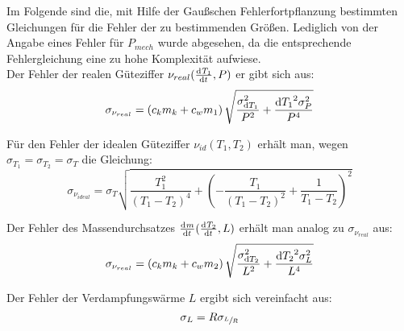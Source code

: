 Im Folgende sind die, mit Hilfe der Gaußschen Fehlerfortpflanzung bestimmten 
Gleichungen für die Fehler der zu bestimmenden Größen. Lediglich von der Angabe 
eines Fehler für $P_{mech}$ wurde abgesehen, da die entsprechende Fehlergleichung 
eine zu hohe Komplexität aufwiese.\\

Der Fehler der realen Güteziffer $\nu_{real}(\od{T_{1}}{t}, P)$ er gibt sich aus:
\[ 
	\sigma_{\nu_{real}} = \left(c_{k} m_{k} + c_{w} m_{1}\right)  \sqrt{\dfrac{\sigma_{\dif{T_{1}}}^{2}}{P^{2}} + \dfrac{\dif{T_{1}}^{2} \sigma_{P}^{2}}{P^{4}}}
\]

 Für den Fehler der idealen Güteziffer $\nu_{id}(T_{1},T_{2})$ erhält man, wegen $\sigma_{T_{1}} = \sigma_{T_{2}} = \sigma_{T}$ die Gleichung:
 \[
 	\sigma_{\nu_{ideal}} = \sigma_{T} \sqrt{\frac{T_{1}^{2}}{\left(T_{1} - T_{2}\right)^{4}} + \left(- \frac{T_{1}}{\left(T_{1} - T_{2}\right)^{2}} + \frac{1}{T_{1} - T_{2}}\right)^{2}}
 \]
 
 Der Fehler des Massendurchsatzes $\od{m}{t}(\od{T_{2}}{t}, L)$ erhält man analog zu $\sigma_{\nu_{real}}$ aus:
 \[
 	\sigma_{\nu_{real}} = \left(c_{k} m_{k} + c_{w} m_{2}\right)  \sqrt{\dfrac{\sigma_{\dif{T_{2}}}^{2}}{L^{2}} + \dfrac{\dif{T_{2}}^{2} \sigma_{L}^{2}}{L^{4}}}
 \] 
 
 Der Fehler der Verdampfungswärme $L$ ergibt sich vereinfacht aus:
 \[
 	\sigma_{L} = R \sigma_{\sfrac{L}{R}}
 \] 